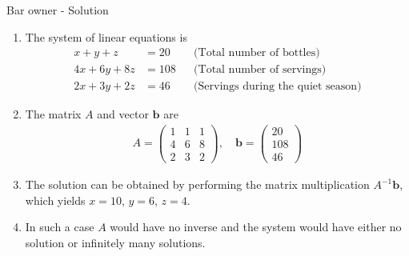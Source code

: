 \documentclass[9pt]{beamer}
\begin{document}
\begin{frame}{Bar owner - Solution}
    \begin{enumerate}[leftmargin = 0.5cm, label = (\alph*), rightmargin = 0.2cm]
        
        \item The system of linear equations is
        \begin{align*}
            x + y + z &= 20  && \text{(Total number of bottles)} \\
            4x + 6y + 8z &= 108 && \text{(Total number of servings)} \\
            2x + 3y + 2z &= 46 && \text{(Servings during the quiet season)}
        \end{align*}

        \item The matrix $A$ and vector $\pmb{b}$ are
        \begin{align*}
            A = 
            \begin{pmatrix}
                1 & 1 & 1 \\
                4 &  6 &  8 \\
                2 &  3 & 2
            \end{pmatrix}, \quad
            \pmb{b} = 
            \begin{pmatrix}
                20 \\
                108 \\
                46
            \end{pmatrix}
        \end{align*}

        \item The solution can be obtained by performing the matrix multiplication $A^{-1}\pmb{b}$, which yields $x = 10$, $y = 6$, $z = 4$.

        \item In such a case $A$ would have no inverse and the system would have either no solution or infinitely many solutions.
        
    \end{enumerate}
\end{frame}
\end{document}

